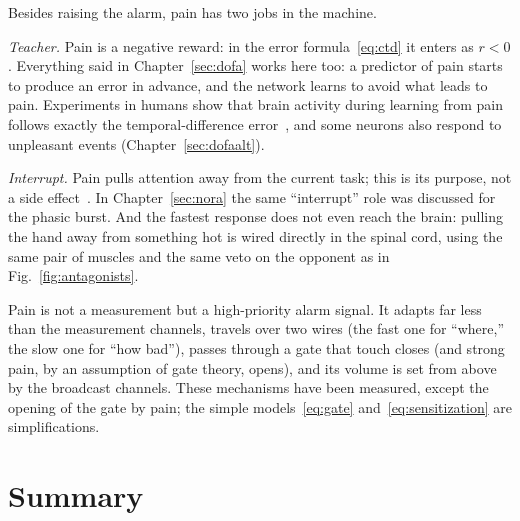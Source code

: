 Besides raising the alarm, pain has two jobs in the machine.

\emph{Teacher.} Pain is a negative reward: in the error formula~\eqref{eq:ctd} it enters as $r<0$. Everything said in Chapter~\ref{sec:dofa} works here too: a predictor of pain starts to produce an error in advance, and the network learns to avoid what leads to pain. Experiments in humans show that brain activity during learning from pain follows exactly the temporal-difference error~\cite{Seymour2004}, and some  neurons also respond to unpleasant events (Chapter~\ref{sec:dofaalt}).

\emph{Interrupt.} Pain pulls attention away from the current task; this is its purpose, not a side effect~\cite{EcclestonCrombez1999}. In Chapter~\ref{sec:nora} the same ``interrupt'' role was discussed for the phasic  burst. And the fastest response does not even reach the brain: pulling the hand away from something hot is wired directly in the spinal cord, using the same pair of muscles and the same veto on the opponent as in Fig.~\ref{fig:antagonists}.

\begin{keyblock}
\begin{proposition}
\label{prop:pain}
Pain is not a measurement but a high-priority alarm signal. It adapts far less than the measurement channels, travels over two wires (the fast one for ``where,'' the slow one for ``how bad''), passes through a gate that touch closes (and strong pain, by an assumption of gate theory, opens), and its volume is set from above by the broadcast channels. These mechanisms have been measured, except the opening of the gate by pain; the simple models~\eqref{eq:gate} and~\eqref{eq:sensitization} are simplifications.
\end{proposition}
\end{keyblock}

\section{Summary}

